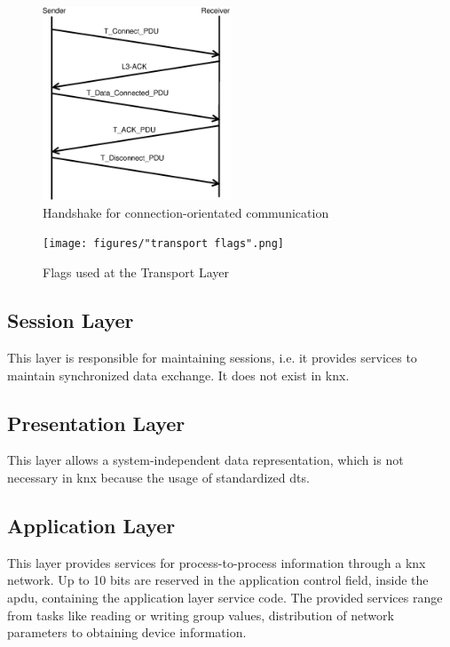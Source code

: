  \begin{figure}
    \centering
    \includegraphics[width=0.5\textwidth]{figures/TransportHandshake.eps}
    \caption{Handshake for connection-orientated communication}
    \label{fig:handshake}
\end{figure}
 
\begin{figure}
    \centering
    \texttt{[image: figures/"transport flags".png]}
    \caption{Flags used at the Transport Layer}
    \label{fig:tFlags}
\end{figure}

\subsection{Session Layer}

This layer is responsible for maintaining sessions, i.e. it provides services to maintain synchronized data exchange. It does not exist in \gls{knx}.

\subsection{Presentation Layer}

This layer allows a system-independent data representation, which is not necessary in \gls{knx} because the usage of standardized \glspl{dt}.

\subsection{Application Layer}

This layer provides services for process-to-process information through a \gls{knx} network. Up to 10 bits are reserved in the application control field,
inside the \gls{apdu}, containing the application layer service code. The provided services range from tasks like reading or writing group values, distribution of network
parameters to obtaining device information.